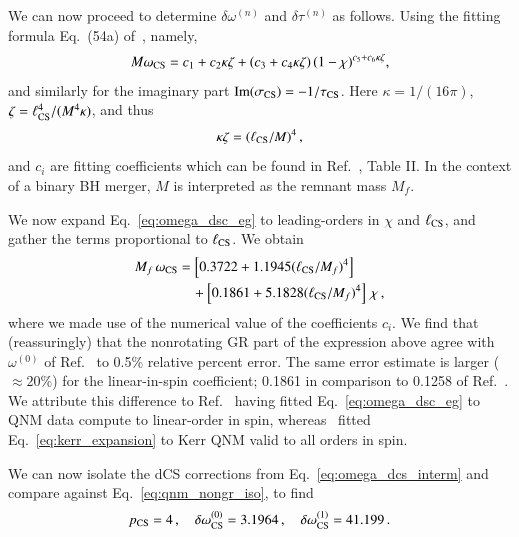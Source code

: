 \documentclass[twocolumn,
               prd,
               aps,
               superscriptaddress,
               tightenlines,
               nofootinbib,
               eqsecnum,
               amsfonts,
               amsmath,
               longbibliography]{revtex4-1}
\newcommand{\Mf}{M_f}
\begin{document}
We can now proceed to determine $\delta\omega^{(n)}$ and $\delta\tau^{(n)}$ as follows.
%
Using the fitting formula Eq.~(54a) of~\cite{Wagle:2021tam}, namely,
%
\begin{equation}
    M \omega_{\rm CS} = c_{1} + c_{2} \kappa \zeta + (c_{3} + c_{4} \kappa \zeta) \, (1 - \chi)^{c_{5} + c_{6} \kappa \zeta},
    \label{eq:omega_dsc_eg}
\end{equation}
%
and similarly for the imaginary part ${\rm Im}(\sigma_{\rm CS}) =  - 1 / \tau_{\rm CS}$.
%
Here $\kappa = 1/(16 \pi)$, $\zeta = \ell_{\rm CS}^{4} / (M^4 \kappa)$, and thus
%
\begin{equation}
\kappa \zeta = (\ell_{\rm CS} / M)^4 \,,
\end{equation}
%
and $c_{i}$ are fitting coefficients which can be found in Ref.~\cite{Wagle:2021tam}, Table II.
%
In the context of a binary BH merger, $M$ is interpreted as the remnant mass $\Mf$.

We now expand Eq.~\eqref{eq:omega_dsc_eg} to leading-orders in $\chi$ and $\ell_{\rm CS}$, and
gather the terms proportional to $\ell_{\rm CS}$.
%
We obtain
%
\begin{align}
    \Mf \, \omega_{\rm CS} &=
    \left[ 0.3722 + 1.1945 (\ell_{\rm CS} / \Mf)^4 \right]
    \nonumber \\
    &\quad + \left[0.1861 + 5.1828 (\ell_{\rm CS} / \Mf)^4 \right] \, \chi\,,
    \label{eq:omega_dcs_interm}
\end{align}
%
where we made use of the numerical value of the coefficients $c_{i}$.
%
We find that (reassuringly) that the nonrotating GR part of the expression above agree with $\omega^{(0)}$ of Ref.~\cite{Maselli:2019mjd}
to 0.5\% relative percent error. The same error estimate is larger ($\approx 20$\%) for the linear-in-spin coefficient;
0.1861 in comparison to 0.1258 of Ref.~\cite{Maselli:2019mjd}.
%
We attribute this difference to Ref.~\cite{Wagle:2021tam} having fitted Eq.~\eqref{eq:omega_dsc_eg} to QNM data compute to linear-order in spin, whereas~\cite{Maselli:2019mjd}
fitted Eq.~\eqref{eq:kerr_expansion} to Kerr QNM valid to all orders in spin.

We can now isolate the dCS corrections from Eq.~\eqref{eq:omega_dcs_interm} and
compare against Eq.~\eqref{eq:qnm_nongr_iso}, to find
%
\begin{equation}
p_{\rm CS} = 4\,, \quad \delta \omega^{(0)}_{\rm CS} = 3.1964\,, \quad \delta \omega^{(1)}_{\rm CS} = 41.199\,.
\label{eq:cs_omega_coefs}
\end{equation}
\end{document}
